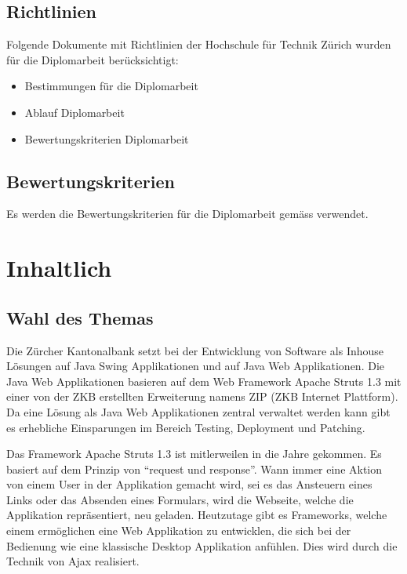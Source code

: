 \documentclass[
11pt, %
a4paper, %
BCOR25mm, %
DIV14, %
footsepline = false, %
headsepline, %
twoside, %
openright,
abstracton, %
listof=totocnumbered, %
bibliography=totocnumbered %
]{scrreprt}
\begin{document}
  \subsection{Richtlinien}
  Folgende Dokumente mit Richtlinien der Hochschule für Technik Zürich wurden
  für die Diplomarbeit berücksichtigt:

  \begin{itemize}
      \item Bestimmungen für die Diplomarbeit \cite{hsz_reglement}
      \item Ablauf Diplomarbeit \cite{hsz_ablauf}
      \item Bewertungskriterien Diplomarbeit \cite{hsz_bewertungskriterien}
  \end{itemize} 
    
  \subsection{Bewertungskriterien}
  
  Es werden die Bewertungskriterien für die Diplomarbeit gemäss
  \cite{hsz_bewertungskriterien} verwendet.
  
  \section{Inhaltlich}
  
  \subsection{Wahl des Themas}
  
  Die Zürcher Kantonalbank setzt bei der Entwicklung von Software als Inhouse
  Lösungen auf Java Swing Applikationen und auf Java Web Applikationen. Die
  Java Web Applikationen basieren auf dem Web Framework Apache Struts 1.3
  mit einer von der ZKB erstellten Erweiterung namens ZIP (ZKB Internet
  Plattform). Da eine Lösung als Java Web Applikationen zentral verwaltet
  werden kann gibt es erhebliche Einsparungen im Bereich Testing, Deployment
  und Patching.
  
  Das Framework Apache Struts 1.3 ist mitlerweilen in die Jahre gekommen. Es
  basiert auf dem Prinzip von ``request und response''. Wann immer eine Aktion
  von einem User in der Applikation gemacht wird, sei es das Ansteuern eines
  Links oder das Absenden eines Formulars, wird die Webseite, welche die
  Applikation repräsentiert, neu geladen. Heutzutage gibt es Frameworks, welche
  einem ermöglichen eine Web Applikation zu entwicklen, die sich bei der
  Bedienung wie eine klassische Desktop Applikation anfühlen. Dies wird durch
  die Technik von \ac{Ajax} realisiert.
  
\end{document}
